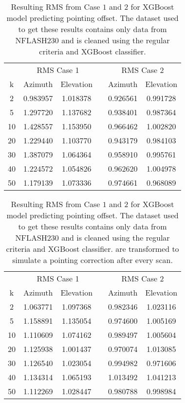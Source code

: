 \begin{table}[h]
    \centering %
    \caption{Resulting RMS from Case $1$ and $2$ for XGBoost model predicting pointing offset.
    The dataset used to get these results contains only data from NFLASH230 and is cleaned using the regular criteria and XGBoost classifier.}
    \begin{tabular}{ccc c cc}
        \toprule
        \multicolumn{1}{c}{} & \multicolumn{2}{c}{RMS Case 1} & & \multicolumn{2}{c}{RMS Case 2} \\
        \cmidrule(lr){2-3} \cmidrule(lr){5-6}
        k & Azimuth & Elevation & & Azimuth & Elevation \\
        \midrule
        2 &  0.983957 &  1.018378 & &  0.926561 &  0.991728 \\
        5 &  1.297720 &  1.137682 & &  0.938401 &  0.987364 \\
       10 &  1.428557 &  1.153950 & &  0.966462 &  1.002820 \\
       20 &  1.229440 &  1.103770 & &  0.943179 &  0.984103 \\
       30 &  1.387079 &  1.064364 & &  0.958910 &  0.995761 \\
       40 &  1.224572 &  1.054826 & &  0.962620 &  1.004978 \\
       50 &  1.179139 &  1.073336 & &  0.974661 &  0.968089 \\
        \bottomrule
    \end{tabular}
\end{table}


\begin{table}[h]
    \centering %
    \caption{Resulting RMS from Case $1$ and $2$ for XGBoost model predicting pointing offset.
    The dataset used to get these results contains only data from NFLASH230 and is cleaned using the regular criteria and XGBoost classifier.
    are transformed to simulate a pointing correction after every scan.}
    \begin{tabular}{ccc c cc}
        \toprule
        \multicolumn{1}{c}{} & \multicolumn{2}{c}{RMS Case 1} & & \multicolumn{2}{c}{RMS Case 2} \\
        \cmidrule(lr){2-3} \cmidrule(lr){5-6}
        k & Azimuth & Elevation & & Azimuth & Elevation \\
        \midrule
        2 &  1.063771 &  1.097368 & &  0.982346 &  1.023116 \\
        5 &  1.158891 &  1.135054 & &  0.974600 &  1.005169 \\
       10 &  1.110609 &  1.074162 & &  0.989497 &  1.005604 \\
       20 &  1.125938 &  1.001437 & &  0.970074 &  1.013085 \\
       30 &  1.126540 &  1.023054 & &  0.994982 &  0.971606 \\
       40 &  1.134314 &  1.065193 & &  1.013492 &  1.041213 \\
       50 &  1.112269 &  1.028447 & &  0.980788 &  0.998984 \\
       \bottomrule
        \bottomrule
    \end{tabular}
\end{table}

